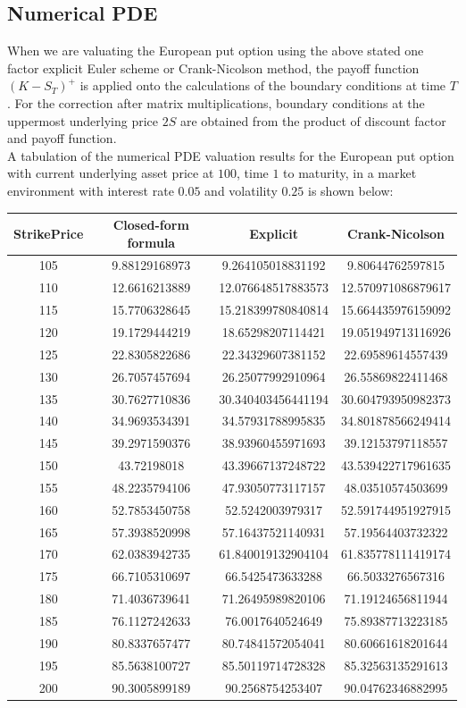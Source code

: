\subsection{Numerical PDE}
When we are valuating the European put option using the above stated one factor explicit Euler scheme or Crank-Nicolson method, the payoff function $(K - S_{T})^{+}$ is applied onto the calculations of the boundary conditions at time $T$. For the correction after matrix multiplications, boundary conditions at the uppermost underlying price $2S$ are obtained from the product of discount factor and payoff function.\\[1mm]
A tabulation of the numerical PDE valuation results for the European put option with current underlying asset price at $100$, time $1$ to maturity, in a market environment with interest rate $0.05$ and volatility $0.25$ is shown below:
\begin{center}
\begin{tabular}{|c|c|c|c|}
\hline
StrikePrice & Closed-form formula & Explicit & Crank-Nicolson\\
\hline
105&9.88129168973 & 9.264105018831192 &   9.80644762597815 \\
110&12.6616213889 & 12.076648517883573 &  12.570971086879617\\
115&15.7706328645 & 15.218399780840814 &  15.664435976159092\\
120&19.1729444219 & 18.65298207114421 &   19.051949713116926\\
125&22.8305822686 & 22.34329607381152 &   22.69589614557439 \\
130&26.7057457694 & 26.25077992910964 &   26.55869822411468 \\
135&30.7627710836 & 30.340403456441194 &  30.604793950982373\\
140&34.9693534391 & 34.57931788995835 &   34.801878566249414\\
145&39.2971590376 & 38.93960455971693 &   39.12153797118557 \\
150&43.72198018    & 43.39667137248722 &   43.539422717961635\\
155&48.2235794106 & 47.93050773117157 &   48.03510574503699 \\
160&52.7853450758 & 52.5242003979317 &    52.591744951927915\\
165&57.3938520998 & 57.16437521140931 &   57.19564403732322 \\
170&62.0383942735 & 61.840019132904104 &  61.835778111419174\\
175&66.7105310697 & 66.5425473633288 &    66.5033276567316 \\
180&71.4036739641 & 71.26495989820106 &   71.19124656811944 \\
185&76.1127242633 & 76.0017640524649 &    75.89387713223185 \\
190&80.8337657477 & 80.74841572054041 &   80.60661618201644 \\
195&85.5638100727 & 85.50119714728328 &   85.32563135291613 \\
200&90.3005899189 & 90.2568754253407 &    90.04762346882995 \\
\hline
\end{tabular}
\end{center}
